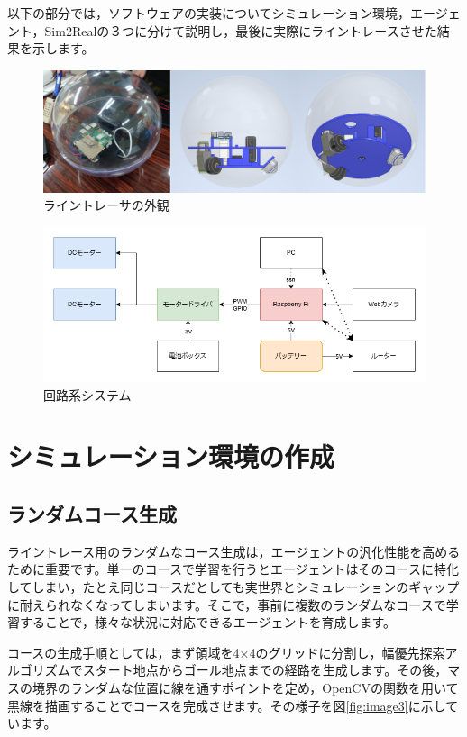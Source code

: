 以下の部分では，ソフトウェアの実装についてシミュレーション環境，エージェント，Sim2Realの３つに分けて説明し，最後に実際にライントレースさせた結果を示します。

\begin{figure}[h]
  \centering
  \includegraphics[width=1\hsize]{line-tracer/fig/image1.png}
  \caption{ライントレーサの外観}
  \label{fig:image1}
\end{figure}

\begin{figure}[h]
  \centering
  \includegraphics[width=1\hsize]{line-tracer/fig/image2.png}
  \caption{回路系システム}
  \label{fig:image2}
\end{figure}

\section{シミュレーション環境の作成}

\subsection{ランダムコース生成}
ライントレース用のランダムなコース生成は，エージェントの汎化性能を高めるために重要です。単一のコースで学習を行うとエージェントはそのコースに特化してしまい，たとえ同じコースだとしても実世界とシミュレーションのギャップに耐えられなくなってしまいます。そこで，事前に複数のランダムなコースで学習することで，様々な状況に対応できるエージェントを育成します。

コースの生成手順としては，まず領域を4×4のグリッドに分割し，幅優先探索アルゴリズムでスタート地点からゴール地点までの経路を生成します。その後，マスの境界のランダムな位置に線を通すポイントを定め，OpenCVの関数を用いて黒線を描画することでコースを完成させます。その様子を図\ref{fig:image3}に示しています。

